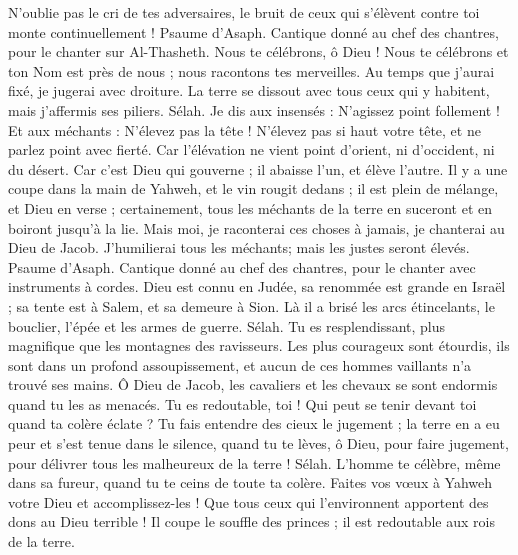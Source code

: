 \begin{multicols}{2}
N'oublie pas le cri de tes adversaires, le bruit de ceux qui s'élèvent contre toi monte continuellement !
\VerseOne{}Psaume d'Asaph. Cantique donné au chef des chantres, pour le chanter sur Al-Thasheth.
Nous te célébrons, ô Dieu ! Nous te célébrons et ton Nom est près de nous ; nous racontons tes merveilles.
Au temps que j'aurai fixé, je jugerai avec droiture.
La terre se dissout avec tous ceux qui y habitent, mais j'affermis ses piliers. Sélah.
Je dis aux insensés : N'agissez point follement ! Et aux méchants : N'élevez pas la tête !
N'élevez pas si haut votre tête, et ne parlez point avec fierté.
Car l'élévation ne vient point d'orient, ni d'occident, ni du désert.
Car c'est Dieu qui gouverne ; il abaisse l'un, et élève l'autre.
Il y a une coupe dans la main de Yahweh, et le vin rougit dedans ; il est plein de mélange, et Dieu en verse ; certainement, tous les méchants de la terre en suceront et en boiront jusqu'à la lie.
Mais moi, je raconterai ces choses à jamais, je chanterai au Dieu de Jacob.
J'humilierai tous les méchants; mais les justes seront élevés.
\VerseOne{}Psaume d'Asaph. Cantique donné au chef des chantres, pour le chanter avec instruments à cordes.
Dieu est connu en Judée, sa renommée est grande en Israël ;
sa tente est à Salem, et sa demeure à Sion.
Là il a brisé les arcs étincelants, le bouclier, l'épée et les armes de guerre. Sélah.
Tu es resplendissant, plus magnifique que les montagnes des ravisseurs.
Les plus courageux sont étourdis, ils sont dans un profond assoupissement, et aucun de ces hommes vaillants n'a trouvé ses mains.
Ô Dieu de Jacob, les cavaliers et les chevaux se sont endormis quand tu les as menacés.
Tu es redoutable, toi ! Qui peut se tenir devant toi quand ta colère éclate ?
Tu fais entendre des cieux le jugement ; la terre en a eu peur et s'est tenue dans le silence,
quand tu te lèves, ô Dieu, pour faire jugement, pour délivrer tous les malheureux de la terre ! Sélah.
L'homme te célèbre, même dans sa fureur, quand tu te ceins de toute ta colère.
Faites vos vœux à Yahweh votre Dieu et accomplissez-les ! Que tous ceux qui l'environnent apportent des dons au Dieu terrible !
Il coupe le souffle des princes ; il est redoutable aux rois de la terre.

\end{multicols}
